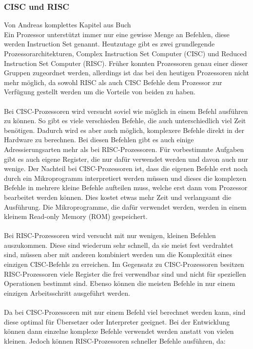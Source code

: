 \documentclass[12pt]{article}
\begin{document}
\subsubsection{CISC und RISC}
Von Andreas
komplettes Kapitel aus Buch \\
Ein Prozessor unterstützt immer nur eine gewisse Menge an Befehlen, diese werden Instruction Set genannt. Heutzutage gibt es zwei grundlegende Prozessorarchitekturen, Complex Instruction Set Computer (CISC) und Reduced Instruction Set Computer (RISC). Früher konnten Prozessoren genau einer dieser Gruppen zugeordnet werden, allerdings ist das bei den heutigen Prozessoren nicht mehr möglich, da sowohl RISC als auch CISC Befehle dem Prozessor zur Verfügung gestellt werden um die Vorteile von beiden zu haben.\\\\
Bei CISC-Prozessoren wird versucht soviel wie möglich in einem Befehl ausführen zu können. So gibt es viele verschieden Befehle, die auch unterschiedlich viel Zeit benötigen. Dadurch wird es aber auch möglich, komplexere Befehle direkt in der Hardware zu berechnen. Bei diesen Befehlen gibt es auch einige Adressierungsarten mehr als bei RISC-Prozessoren. Für vorbestimmte Aufgaben gibt es auch eigene Register, die nur dafür verwendet werden und davon auch nur wenige. Der Nachteil bei CISC-Prozessoren ist, dass die eigenen Befehle erst noch durch ein Mikroprogramm interpretiert werden müssen und dieses die komplexen Befehle in mehrere kleine Befehle aufteilen muss, welche erst dann vom Prozessor bearbeitet werden können. Dies kostet etwas mehr Zeit und verlangsamt die Ausführung. Die Mikroprogramme, die dafür verwendet werden, werden in einem kleinem Read-only Memory (ROM) gespeichert.\\\\
Bei RISC-Prozessoren wird versucht mit nur wenigen, kleinen Befehlen auszukommen. Diese sind wiederum sehr schnell, da sie meist fest verdrahtet sind, müssen aber mit anderen kombiniert werden um die Komplexität eines einzigen CISC-Befehls zu erreichen.  Im Gegensatz zu CISC-Prozessoren besitzen RISC-Prozessoren viele Register die frei verwendbar sind und nicht für speziellen Operationen bestimmt sind. Ebenso können die meisten Befehle in nur einem einzigen Arbeitsschritt ausgeführt werden.\\\\
Da bei CISC-Prozessoren mit nur einem Befehl viel berechnet werden kann, sind diese optimal für Übersetzer oder Interpreter geeignet. Bei der Entwicklung können dann einzelne komplexe Befehle verwendet werden anstatt von vielen kleinen. Jedoch können RISC-Prozessoren schneller Befehle ausführen, da:
\end{document}
